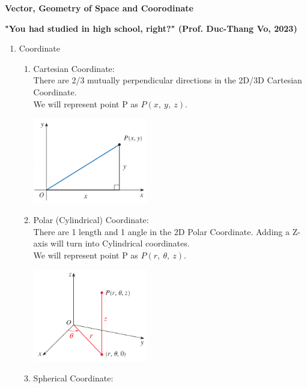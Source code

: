 \documentclass[12px]{article}
\begin{document}
\begin{center}
    \Large\textbf{Vector, Geometry of Space and Coorodinate}\\
\end{center}
\begin{center}
    \textbf{"You had studied in high school, right?" (Prof. Duc-Thang Vo, 2023)}
\end{center}

\begin{enumerate}
    \item Coordinate
    \begin{enumerate}[(1)]
        \item Cartesian Coordinate:\\
            There are 2/3 mutually perpendicular directions in the 2D/3D Cartesian Coordinate.\\
            We will represent point P as $P(x,\ y,\ z)$.
            \begin{center}
                \includegraphics[width=5cm]{Cartesian.png}
            \end{center}
        \item Polar (Cylindrical) Coordinate:\\
            There are 1 length and 1 angle in the 2D Polar Coordinate. Adding a Z-axis will turn into Cylindrical coordinates.\\
            We will represent point P as $P(r,\ \theta,\ z)$.
            \begin{center}
                \includegraphics[width=5cm]{Cylindrical.png}
            \end{center}
        \item Spherical Coordinate:\\

\end{enumerate}
\end{enumerate}
\end{document}
